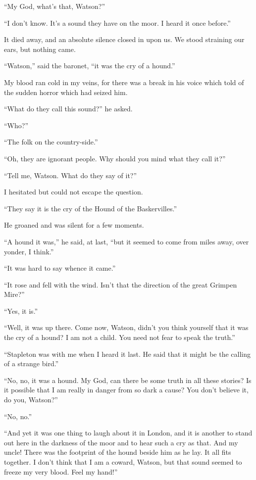\documentclass[paper=5.5in:8.5in,BCOR=7mm,twoside,DIV=calc,12pt,usegeometry,openany,chapterprefix,endperiod]{scrbook} %
\begin{document}
\enquote{My God, what's that, Watson?}

\enquote{I don't know. It's a sound they have on the moor. I heard it once before.}

It died away, and an absolute silence closed in upon us. We stood straining our ears, but nothing came.

\enquote{Watson,} said the baronet, \enquote{it was the cry of a hound.}

My blood ran cold in my veins, for there was a break in his voice which told of the sudden horror which had seized him.

\enquote{What do they call this sound?} he asked.

\enquote{Who?}

\enquote{The folk on the country-side.}

\enquote{Oh, they are ignorant people. Why should you mind what they call it?}

\enquote{Tell me, Watson. What do they say of it?}

I hesitated but could not escape the question.

\enquote{They say it is the cry of the Hound of the Baskervilles.}

He groaned and was silent for a few moments.

\enquote{A hound it was,} he said, at last, \enquote{but it seemed to come from miles away, over yonder, I think.}

\enquote{It was hard to say whence it came.}

\enquote{It rose and fell with the wind. Isn't that the direction of the great Grimpen Mire?}

\enquote{Yes, it is.}

\enquote{Well, it was up there. Come now, Watson, didn't you think yourself that it was the cry of a hound? I am not a child. You need not fear to speak the truth.}

\enquote{Stapleton was with me when I heard it last. He said that it might be the calling of a strange bird.}

\enquote{No, no, it was a hound. My God, can there be some truth in all these stories? Is it possible that I am really in danger from so dark a cause? You don't believe it, do you, Watson?}

\enquote{No, no.}

\enquote{And yet it was one thing to laugh about it in London, and it is another to stand out here in the darkness of the moor and to hear such a cry as that. And my uncle! There was the footprint of the hound beside him as he lay. It all fits together. I don't think that I am a coward, Watson, but that sound seemed to freeze my very blood. Feel my hand!}
\end{document}
